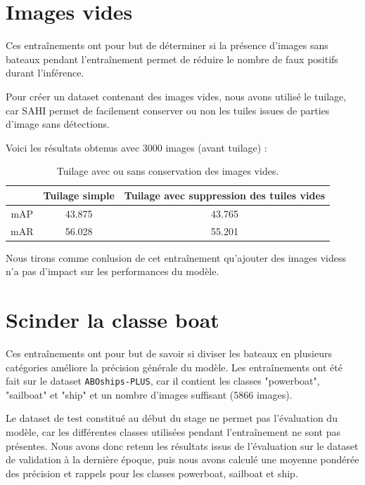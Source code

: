 \section{Images vides}

Ces entraînements ont pour but de déterminer si la présence d'images sans bateaux pendant l'entraînement
permet de réduire le nombre de faux positifs durant l'inférence.

Pour créer un dataset contenant des images vides, nous avons utilisé le tuilage, car SAHI permet
de facilement conserver ou non les tuiles issues de parties d'image sans détections.

Voici les résultats obtenus avec 3000 images (avant tuilage) : \\

\begin{table}[h]
    \begin{center}
        \begin{tabular}{c c c}
            \hline
            & Tuilage simple & Tuilage avec suppression des tuiles vides \\
            \hline
            mAP & 43.875 & 43.765 \\
            mAR & 56.028 & 55.201 \\
        \end{tabular}
    \end{center}
    \caption{Tuilage avec ou sans conservation des images vides.}
\end{table}

Nous tirons comme conlusion de cet entraînement qu'ajouter des images videss
n'a pas d'impact sur les performances du modèle.

\section{Scinder la classe boat}

Ces entraînements ont pour but de savoir si diviser les bateaux en plusieurs
catégories améliore la précision générale du modèle.
Les entraînements ont été fait sur le dataset \texttt{ABOships-PLUS},
car il contient les classes "powerboat", "sailboat" et "ship"
et un nombre d'images suffisant (5866 images).

Le dataset de test constitué au début du stage ne permet pas l'évaluation du modèle, car les différentes classes utilisées pendant l'entraînement ne sont pas présentes.
Nous avons donc retenu les résultats issus de l'évaluation sur le dataset de validation
à la dernière époque, puis nous avons calculé une moyenne pondérée des précision
et rappels pour les classes powerboat, sailboat et ship. \\

